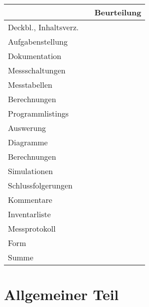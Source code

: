 \begin{titlepage}
	\begin{table}[h]
		\renewcommand{\arraystretch}{1.3}
		\raggedleft
		{\large
		\begin{tabular}{l| p{0.6cm} |l}
			\multicolumn{2}{l|}{}            & Beurteilung \\\hline
			Deckbl., Inhaltsverz.          & &             \\\hline
			Aufgabenstellung               & &             \\\hline
			Dokumentation                  & &             \\\hline
			\hspace{5mm}Messschaltungen    & &             \\\hline
			\hspace{5mm}Messtabellen       & &             \\\hline
			\hspace{5mm}Berechnungen       & &             \\\hline
			\hspace{5mm}Programmlistings   & &             \\\hline
			Auswerung                      & &             \\\hline
			\hspace{5mm}Diagramme          & &             \\\hline
			\hspace{5mm}Berechnungen       & &             \\\hline
			\hspace{5mm}Simulationen       & &             \\\hline
			\hspace{5mm}Schlussfolgerungen & &             \\\hline
			\hspace{5mm}Kommentare         & &             \\\hline
			Inventarliste                  & &             \\\hline
			Messprotokoll                  & &             \\\hline
			Form                           & &             \\\hline
			\multicolumn{2}{l|}{Summe}       &             \\
		\end{tabular}
		}
	\end{table}
\end{titlepage}

\section*{Allgemeiner Teil}

